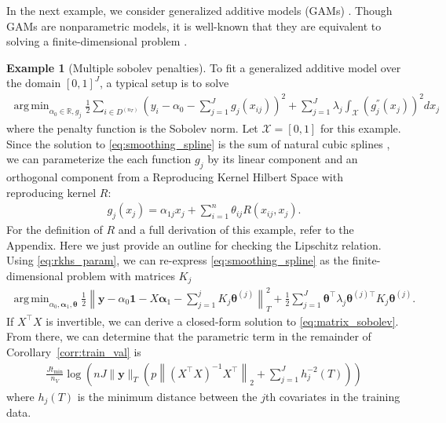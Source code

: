\documentclass[12pt]{article} %
\theoremstyle{definition}
\newtheorem{example}{Example}
\DeclareMathOperator*{\argmin}{arg\,min}
\begin{document}
In the next example, we consider generalized additive models (GAMs) \citep{hastie1990generalized}.
Though GAMs are nonparametric models, it is well-known that they are equivalent to solving a finite-dimensional problem \citep{green1993nonparametric, o1986automatic, buja1989linear}.
\begin{example}[Multiple sobolev penalties]
	\label{example:sobolev}
	To fit a generalized additive model over the domain $[0,1]^J$, a typical setup is to solve
	\begin{align}
	\argmin_{\alpha_0 \in \mathbb{R}, g_j}
	\frac{1}{2} \sum_{i\in D^{(n_T)}}
	\left(
	y_i - \alpha_0 - \sum_{j=1}^J g_j(x_{ij})
	\right)^2
	+ \sum_{j=1}^{J} \lambda_j \int_{\mathcal{X}} \left(g_j^{''}(x_j)\right)^{2} dx_j
	\label{eq:smoothing_spline}
	\end{align}
	where the penalty function is the Sobolev norm.
	Let $\mathcal{X} = [0,1]$ for this example.
	Since the solution to \eqref{eq:smoothing_spline} is the sum of natural cubic splines \citep{buja1989linear}, we can parameterize the each function $g_j$ by its linear component and an orthogonal component from a Reproducing Kernel Hilbert Space with reproducing kernel $R$:
	\begin{align}
	g_j(x_j) = \alpha_{1j} x_j + \sum_{i=1}^n \theta_{ij} R(x_{ij}, x_j).
	\label{eq:rkhs_param}
	\end{align}
	For the definition of $R$ and a full derivation of this example, refer to the Appendix.
	Here we just provide an outline for checking the Lipschitz relation.
	Using \eqref{eq:rkhs_param}, we can re-express \eqref{eq:smoothing_spline} as the finite-dimensional problem with matrices $K_j$
	\begin{align}
	\argmin_{\alpha_0, \boldsymbol{\alpha}_1, \boldsymbol{\theta}}
	\frac{1}{2}
	\left \|
	\boldsymbol{y} -
	\alpha_0 \boldsymbol{1}
	- X \boldsymbol{\alpha}_1
	- \sum_{j=1}^j K_j \boldsymbol{\theta}^{(j)}
	\right \|^2_T
	+
	\frac{1}{2}
	\sum_{j = 1}^J
	\boldsymbol{\theta}^\top
	\lambda_j \boldsymbol{\theta}^{(j)\top} K_j \boldsymbol{\theta}^{(j)}.
	\label{eq:matrix_sobolev}
	\end{align}
	If $X^\top X$ is invertible, we can derive a closed-form solution to \eqref{eq:matrix_sobolev}.
	From there, we can determine that the parametric term in the remainder of Corollary~\ref{corr:train_val} is
	\begin{align}
	\frac{J t_{\min}}{n_{V}} \log \left (
	n
	J
	\|\boldsymbol{y}\|_T
	\left(
	p
	\left \|
	\left(
	X^\top X
	\right)^{-1}
	X^\top
	\right \|_2
	+
	\sum_{j=1}^J h_j^{-2}(T)
	\right)
	\right )
	\label{eq:sobolev_param}
	\end{align}
	where $h_j(T)$ is the minimum distance between the $j$th covariates in the training data.
\end{example}
\end{document}
